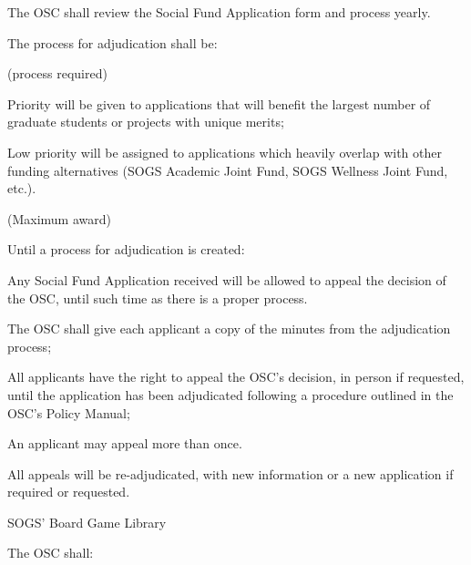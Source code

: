 \begin{longenum}[ label*=\thesubsection.\arabic*., align=left]
\begin{longenum}[label*=\arabic*., align=left]
\begin{longenum}[label*=\arabic*., align=left]
			\end{longenum}
		\item The OSC shall review the Social Fund Application form and process yearly.
		\item The process for adjudication shall be:				
			\begin{longenum}[label*=\arabic*., align=left]
			\item (process required)
			\item Priority will be given to applications that will benefit the largest number of graduate students or projects with unique merits;	
			\item Low priority will be assigned to applications which heavily overlap with other funding alternatives (SOGS Academic Joint Fund, SOGS Wellness Joint Fund, etc.).			
			\item (Maximum award)			
			\item Until a process for adjudication is created:			
				\begin{longenum}[label*=\arabic*., align=left]
				\item Any Social Fund Application received will be allowed to appeal the decision of the OSC, until such time as there is a proper process.
					\begin{longenum}[label*=\arabic*., align=left]
					\item The OSC shall give each applicant a copy of the minutes from the adjudication process;
					\item All applicants have the right to appeal the OSC's decision, in person if requested, until the application has been adjudicated following a procedure outlined in the OSC's Policy Manual;
						\begin{longenum}[label*=\arabic*., align=left]
						\item An applicant may appeal more than once.
						\end{longenum}
					\item All appeals will be re-adjudicated, with new information or a new application if required or requested.
					\end{longenum}
				\end{longenum}
			\end{longenum}
		\end{longenum}
	\item SOGS' Board Game Library
		\begin{longenum}[label*=\arabic*., align=left]
		\item The OSC shall:
			\begin{longenum}[label*=\arabic*., align=left]

\end{longenum}
\end{longenum}
\end{longenum}
